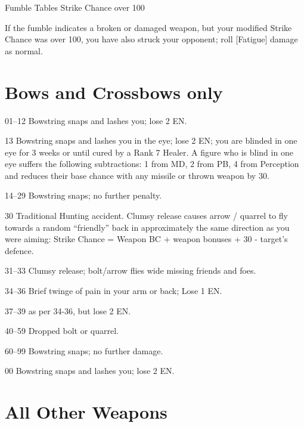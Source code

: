 \begin{Chapter}{Fumble Tables}
Strike Chance over 100 

If the fumble indicates a broken or damaged weapon, but your modified
Strike Chance was over 100, you have also struck your opponent; roll
[Fatigue] damage as normal.

\section{Bows and Crossbows only}

\begin{Description}

\item[01–12] Bowstring snaps and lashes you; lose 2 EN.

\item[13] Bowstring snaps and lashes you in the eye; lose 2 EN; you
  are blinded in one eye for 3 weeks or until cured by a Rank 7
  Healer. A figure who is blind in one eye suffers the following
  subtractions: 1 from MD, 2 from PB, 4 from Perception and reduces
  their base chance with any missile or thrown weapon by 30.

\item[14–29] Bowstring snaps; no further penalty.

\item[30] Traditional Hunting accident. Clumsy release causes arrow /
  quarrel to fly towards a random “friendly” back in approximately the
  same direction as you were aiming: Strike Chance = Weapon BC +
  weapon bonuses + 30 - target’s defence.

\item[31–33]  Clumsy release; bolt/arrow flies wide missing friends and foes. 

\item[34–36] Brief twinge of pain in your arm or back; Lose 1 EN.

\item[37–39] as per 34-36, but lose 2 EN.

\item[40–59] Dropped bolt or quarrel.

\item[60–99] Bowstring snaps; no further damage.

\item[00] Bowstring snaps and lashes you; lose 2 EN.

\end{Description}


\section{All Other Weapons}


\end{Chapter}
